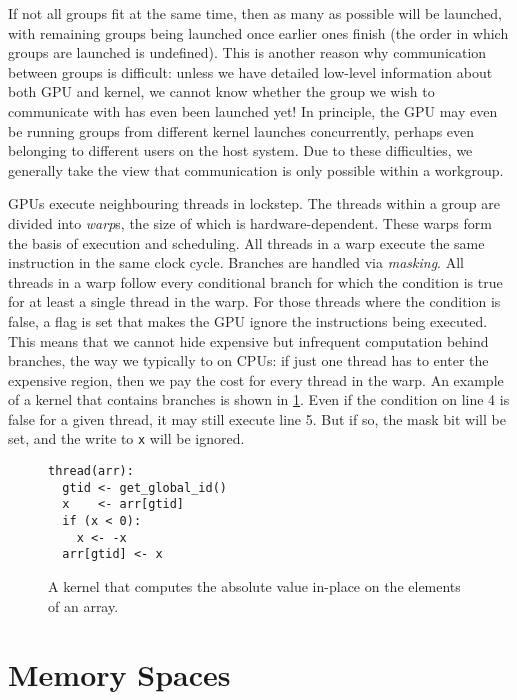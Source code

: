 If not all groups fit at the same time, then as many as possible will
be launched, with remaining groups being launched once earlier ones
finish (the order in which groups are launched is undefined).  This is
another reason why communication between groups is difficult: unless
we have detailed low-level information about both GPU and kernel, we
cannot know whether the group we wish to communicate with has even
been launched yet!  In principle, the GPU may even be running groups
from different kernel launches concurrently, perhaps even belonging to
different users on the host system.  Due to these difficulties, we
generally take the view that communication is only possible within a
workgroup.

GPUs execute neighbouring threads in lockstep.  The threads within a
group are divided into \textit{warp}s, the size of which is
hardware-dependent.  These warps form the basis of execution and
scheduling.  All threads in a warp execute the same instruction in the
same clock cycle.  Branches are handled via \textit{masking}.  All
threads in a warp follow every conditional branch for which the
condition is true for at least a single thread in the warp.  For those
threads where the condition is false, a flag is set that makes the GPU
ignore the instructions being executed.  This means that we cannot
hide expensive but infrequent computation behind branches, the way we
typically to on CPUs: if just one thread has to enter the expensive
region, then we pay the cost for every thread in the warp.  An example
of a kernel that contains branches is shown in \cref{fig:gpu-branch}.
Even if the condition on line 4 is false for a given thread, it may
still execute line 5.  But if so, the mask bit will be set, and the
write to \texttt{x} will be ignored.

\begin{figure}
  \centering

\begin{lstlisting}[language={}]
thread(arr):
  gtid <- get_global_id()
  x    <- arr[gtid]
  if (x < 0):
    x <- -x
  arr[gtid] <- x
\end{lstlisting}

  \caption{A kernel that computes the absolute value in-place on the elements of an array.}
  \label{fig:gpu-branch}
\end{figure}

\section{Memory Spaces}
\label{sec:gpu-memory-spaces}

